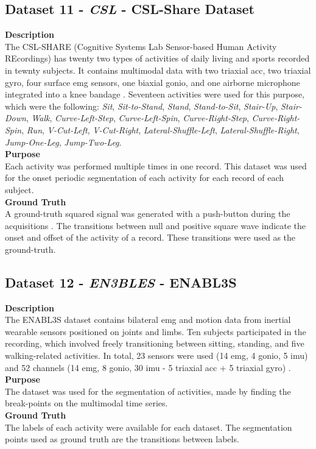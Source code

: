 \subsection{Dataset 11 - \textit{CSL} - CSL-Share Dataset}
\label{dat:dataset12}
\textbf{Description} \hfill \\
The CSL-SHARE (Cognitive Systems Lab Sensor-based Human Activity REcordings) has twenty two types of activities of daily living and sports recorded in tewnty subjects. It contains multimodal data with two triaxial \gls{acc}, two triaxial \gls{gyro}, four surface \gls{emg} sensors, one biaxial \gls{gonio}, and one airborne microphone integrated into a knee bandage \cite{dataset_hui}. Seventeen activities were used for this purpose, which were the following: \textit{Sit}, \textit{Sit-to-Stand}, \textit{Stand}, \textit{Stand-to-Sit}, \textit{Stair-Up}, \textit{Stair-Down}, \textit{Walk}, \textit{Curve-Left-Step}, \textit{Curve-Left-Spin}, \textit{Curve-Right-Step}, \textit{Curve-Right-Spin}, \textit{Run}, \textit{V-Cut-Left}, \textit{V-Cut-Right}, \textit{Lateral-Shuffle-Left}, \textit{Lateral-Shuffle-Right}, \textit{Jump-One-Leg}, \textit{Jump-Two-Leg}.\\
\textbf{Purpose}\\
Each activity was performed multiple times in one record. This dataset was used for the onset periodic segmentation of each activity for each record of each subject.\\
\textbf{Ground Truth}\\
A ground-truth squared signal was generated with a push-button during the acquisitions \cite{dataset_hui}. The transitions between null and positive square wave indicate the onset and offset of the activity of a record. These transitions were used as the ground-truth.

\subsection{Dataset 12 - \textit{EN3BLES} - ENABL3S}
\label{dat:dataset13}
\textbf{Description}\\
The ENABL3S dataset contains bilateral \gls{emg} and motion data from inertial wearable sensors positioned on joints and limbs. Ten subjects participated in the recording, which involved freely transitioning between sitting, standing, and five walking-related activities. In total, 23 sensors were used (14 \gls{emg}, 4 \gls{gonio}, 5 \gls{imu}) and 52 channels (14 \gls{emg}, 8 \gls{gonio}, 30 \gls{imu} - 5 triaxial \gls{acc} + 5 triaxial \gls{gyro}) \cite{enables}.\\
\textbf{Purpose}\\
The dataset was used for the segmentation of activities, made by finding the break-points on the multimodal time series.\\
\textbf{Ground Truth}\\
The labels of each activity were available for each dataset. The segmentation points used as ground truth are the transitions between labels.

